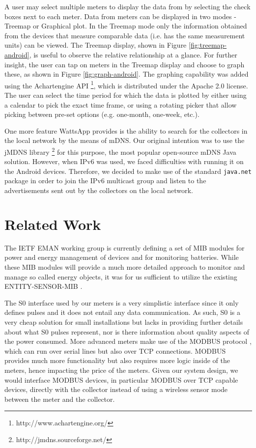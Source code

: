 \documentclass[10pt, conference, compsocconf]{IEEEtran}
\begin{document}
 
A user may select multiple meters to display the data from
by selecting the check boxes next to each meter. Data from meters can
be displayed in two modes - Treemap or Graphical plot. In the Treemap mode
only the information obtained from the devices that measure comparable
data (i.e. has the same measurement units) can be viewed. The Treemap
display, shown in Figure \ref{fig:treemap-android}, is useful to
observe the relative relationship at a glance. For further insight,
the user can tap on meters in the Treemap display and choose to graph
these, as shown in Figure \ref{fig:graph-android}. The graphing capability
was added using the Achartengine API%
\footnote{http://www.achartengine.org/%
}, which is distributed under the Apache 2.0 license. The user can 
select the time period for which the data is plotted by either
using a calendar to pick the exact time frame, or using a rotating
picker that allow picking between pre-set options (e.g. one-month,
one-week, etc.).

One more feature WattsApp provides is the ability to search for the
collectors in the local network by the means of mDNS. Our original
intention was to use the jMDNS library%
\footnote{http://jmdns.sourceforge.net/%
} for this purpose, the most popular open-source mDNS Java solution.
However, when IPv6 was used, we faced difficulties with running it
on the Android devices. Therefore, we decided to make use of the standard
\verb=java.net= package in order to join the IPv6 multicast group
and listen to the advertisements sent out by the collectors on the
local network.


\section{Related Work}

The IETF EMAN working group is currently defining a set of MIB modules
for power and energy management of devices and for monitoring batteries.
While these MIB modules will provide a much more detailed approach
to monitor and manage so called energy objects, it was for us sufficient
to utilize the existing ENTITY-SENSOR-MIB \cite{rfc3433}.

The S0 interface \cite{iec62053-31} used by our meters is a very
simplistic interface since it only defines pulses and it does not
entail any data communication. As such, S0 is a very cheap solution
for small installations but lacks in providing further details about
what S0 pulses represent, nor is there information about quality aspects
of the power consumed. More advanced meters make use of the MODBUS
protocol \cite{iec61158}, which can run over serial lines but also
over TCP connections. MODBUS provides much more functionality but
also requires more logic inside of the meters, hence impacting the
price of the meters. Given our system design, we would interface MODBUS
devices, in particular MODBUS over TCP capable devices, directly with
the collector instead of using a wireless sensor mode between the meter and the collector.
\end{document}
